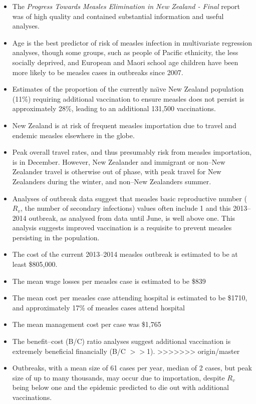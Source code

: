 \documentclass{article}
\begin{document}
\begin{itemize}
\begin{itemize}
\item The \emph {Progress Towards Measles Elimination in New Zealand - Final} report was of high quality and contained substantial information and useful analyses.
\item Age is the best predictor of risk of measles infection in multivariate regression analyses, though some groups, such as people of Pacific ethnicity, the less socially deprived, and European and Maori school age children have been more likely to be measles cases in outbreaks since 2007.
\item Estimates of the proportion of the currently na\"{\i}ve New Zealand population (11\%) requiring additional vaccination to ensure measles does not persist is approximately 28\%, leading to an additional 131,500 vaccinations.
\item New Zealand is at risk of frequent measles importation due to travel and endemic measles elsewhere in the globe.
\item Peak overall travel rates, and thus presumably risk from measles importation, is in December. However, New Zealander and immigrant or non--New Zealander travel is otherwise out of phase, with peak travel for New Zealanders during the winter, and non--New Zealanders summer.
\item Analyses of outbreak data suggest that measles basic reproductive number ($R_v$, the number of secondary infections) values often include 1 and this 2013--2014 outbreak, as analysed from data until June, is well above one. This analysis suggests improved vaccination is a requisite to prevent measles persisting in the population.
\item The cost of the current 2013--2014 measles outbreak is estimated to be at least \$805,000.
\item The mean wage losses per measles case is estimated to be \$839
\item The mean cost per measles case attending hospital is estimated to be \$1710, and approximately 17\% of measles cases attend hospital
\item The mean management cost per case was \$1,765
\item The benefit--cost (B/C) ratio analyses suggest additional vaccination is extremely beneficial financially (B/C $>>$1).
>>>>>>> origin/master
\item Outbreaks, with a mean size of 61 cases per year, median of 2 cases, but peak size of up to many thousands, may occur due to importation, despite $R_v$ being below one and the epidemic predicted to die out with additional vaccinations.
\end{itemize}


\end{itemize}
\end{document}
